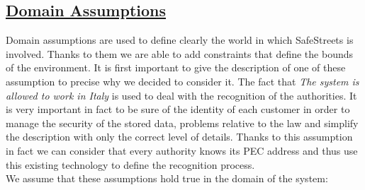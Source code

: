 \subsection[Domain Assumptions]{\hyperlink{toc}{Domain Assumptions}}
	\label{sec:domainAssumptions}
	Domain assumptions are used to define clearly the world in which SafeStreets is involved. Thanks to them we are able to add constraints that define the bounds of the environment. It is first important to give the description of one of these assumption to precise why we decided to consider it. The fact that \emph{The system is allowed to work in Italy} is used to deal with the recognition of the authorities. It is very important in fact to be sure of the identity of each customer in order to manage the security of the stored data, problems relative to the law and simplify the description with only the correct level of details. Thanks to this assumption in fact we can consider that every authority knows its PEC address and thus use this existing technology to define the recognition process. \\
	
	We assume that these assumptions hold true in the domain of the system:
		

